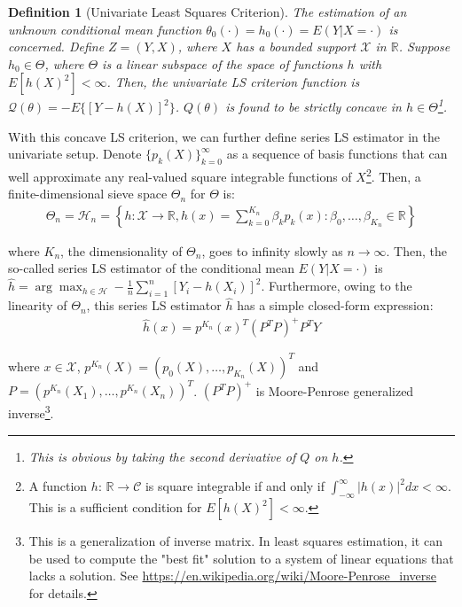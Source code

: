 \documentclass[12pt, a4paper]{article}
\theoremstyle{MAstyle} \newtheorem{assumption}{Assumption}[section]
\theoremstyle{MAstyle} \newtheorem{definition}{Definition}[section]
\theoremstyle{MAstyle} \newtheorem{theorem}{Theorem}[section]
\theoremstyle{MAstyle} \newtheorem{corollary}{Corollary}[section]
\begin{document}
            \begin{definition}[Univariate Least Squares Criterion]\label{least_squares_criterion}
                 The estimation of an unknown conditional mean function $\theta_0(\cdot)=h_0(\cdot)=E(Y|X=\cdot)$ is concerned. Define $Z=(Y,X)$, where $X$ has a bounded support $\mathcal{X}$ in $\mathbb{R}$. Suppose $h_0 \in \mathit{\Theta}$, where $\mathit{\Theta}$ is a linear subspace of the space of functions $h$ with $E[h(X)^2] < \infty$. Then, the univariate LS criterion function is $\mathcal{Q}(\theta)=-E\{[Y-h(X)]^2\}$. $Q(\theta)$ is found to be strictly concave in $h \in \mathit{\Theta}$\footnote{This is obvious by taking the second derivative of $Q$ on $h$.}.
            \end{definition}

            With this concave LS criterion, we can further define series LS estimator in the univariate setup. Denote $\{p_k(X)\}_{k=0}^{\infty}$ as a sequence of basis functions that can well approximate any real-valued square integrable functions of $X$\footnote{A function $h$: $\mathbb{R} \rightarrow \mathcal{C}$ is square integrable if and only if $\int_{-\infty}^{\infty}|h(x)|^2dx < \infty$. This is a sufficient condition for $E[h(X)^2] < \infty$.}. Then, a finite-dimensional sieve space $\mathit{\Theta_n}$ for $\mathit{\Theta}$ is:
            \begin{align}\label{sieve_space}
                \mathit{\Theta_n}=\mathcal{H}_n=\left\{h: \mathcal{X} \rightarrow \mathbb{R}, h(x)=\sum\limits_{k=0}^{K_n}\beta_kp_k(x):\beta_0,\ldots,\beta_{K_n} \in \mathbb{R}\right\}
            \end{align}

            where $K_n$, the dimensionality of $\mathit{\Theta_n}$, goes to infinity slowly as $n \rightarrow \infty$. Then, the so-called series LS estimator of the conditional mean $E(Y|X=\cdot)$ is $\hat{h}=\arg \max_{h \in \mathcal{H}}-\frac{1}{n}\sum_{i=1}^{n}[Y_i-h(X_i)]^2$. Furthermore, owing to the linearity of $\mathit{\Theta_n}$, this series LS estimator $\hat{h}$ has a simple closed-form expression:
            \begin{align}\label{closed_form_series_LS}
                \hat{h}(x)=p^{K_n}(x)^{T}(P^{T}P)^{+}P^{T}Y
            \end{align}

            where $x \in \mathcal{X}$, $p^{K_n}(X)=(p_0(X), \ldots, p_{K_n}(X))^{T}$ and $P=(p^{K_n}(X_1), \ldots, p^{K_n}(X_n))^{T}$. $(P^{T}P)^{+}$ is Moore-Penrose generalized inverse\footnote{This is a generalization of inverse matrix. In least squares estimation, it can be used to compute the "best fit" solution to a system of linear equations that lacks a solution. See
            \url{https://en.wikipedia.org/wiki/Moore-Penrose_inverse}
            for details.}.
\end{document}
